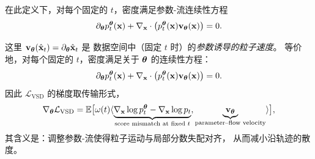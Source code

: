 在此定义下，对每个固定的 $t$，密度满足参数-流连续性方程
\[
\partial_{\bm{\theta}} p_t^{{\bm{\theta}}}({\mathbf{x}})+\nabla_{{\mathbf{x}}}\cdot\big(p_t^{{\bm{\theta}}}({\mathbf{x}}) {\mathbf{v}}_{\bm{\theta}}({\mathbf{x}})\big)=0.
\]

这里 ${\mathbf{v}}_{\bm{\theta}}(\hat{{\mathbf{x}}}_t)=\partial_{\bm{\theta}} \hat{{\mathbf{x}}}_t$ 是
数据空间中（固定 $t$ 时）的\emph{参数诱导的粒子速度}。
等价地，对每个固定的 $t$，密度满足关于 ${\bm{\theta}}$ 的连续性方程：
\[
\partial_{\bm{\theta}} p_t^{{\bm{\theta}}}({\mathbf{x}}) + \nabla_{{\mathbf{x}}} \cdot \big(p_t^{{\bm{\theta}}}({\mathbf{x}}) {\mathbf{v}}_{\bm{\theta}}({\mathbf{x}})\big) = 0.
\]
因此 $\mathcal{L}_{\text{VSD}}$ 的梯度取传输形式，
\[
\nabla_{{\bm{\theta}}}\mathcal{L}_{\text{VSD}}
= \mathbb{E}\big[\omega(t)\langle
\underbrace{\nabla_{{\mathbf{x}}}\log p_t^{{\bm{\theta}}}-\nabla_{{\mathbf{x}}}\log p_t}_{\text{score mismatch at fixed }t},
\underbrace{{\mathbf{v}}_{\bm{\theta}}}_{\text{parameter–flow velocity}}\rangle\big],
\]
其含义是：调整参数-流使得粒子运动与局部分数失配对齐，
从而减小沿轨迹的散度。










